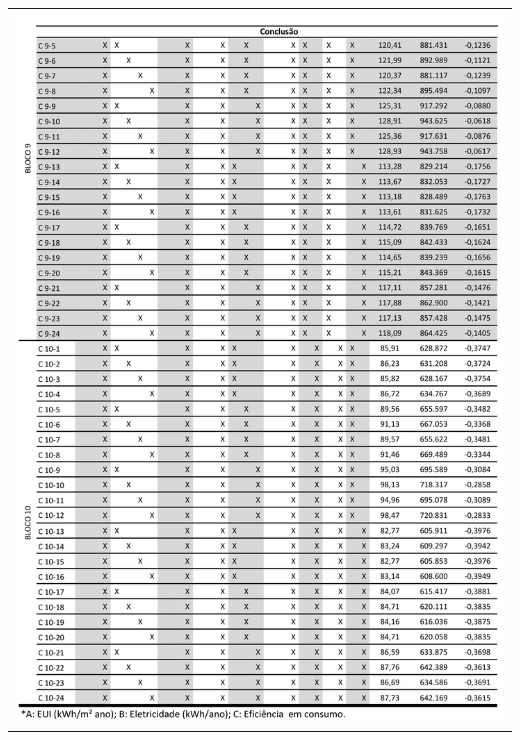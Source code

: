 \begin{table}[H]
    \centering
    \begin{tabular}{l}
        \includegraphics[width=\textwidth]{figures/appendices/tabela04.png}
    \end{tabular}
\end{table}
